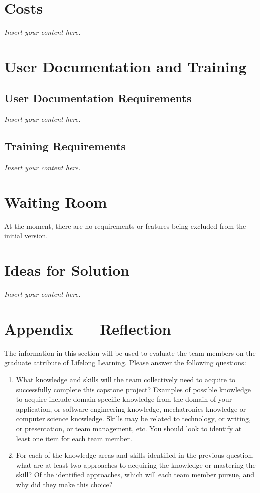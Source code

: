 \documentclass[12pt]{article}
\newcommand{\lips}{\textit{Insert your content here.}}
\begin{document}
\section{Costs}
\lips
\section{User Documentation and Training}
\subsection{User Documentation Requirements}
\lips
\subsection{Training Requirements}
\lips

\section{Waiting Room}
At the moment, there are no requirements or features being excluded from the initial version.

\section{Ideas for Solution}
\lips

\newpage{}
\section*{Appendix --- Reflection}

The information in this section will be used to evaluate the team members on the
graduate attribute of Lifelong Learning.  Please answer the following questions:

\begin{enumerate}
  \item What knowledge and skills will the team collectively need to acquire to
  successfully complete this capstone project?  Examples of possible knowledge
  to acquire include domain specific knowledge from the domain of your
  application, or software engineering knowledge, mechatronics knowledge or
  computer science knowledge.  Skills may be related to technology, or writing,
  or presentation, or team management, etc.  You should look to identify at
  least one item for each team member.
  \item For each of the knowledge areas and skills identified in the previous
  question, what are at least two approaches to acquiring the knowledge or
  mastering the skill?  Of the identified approaches, which will each team
  member pursue, and why did they make this choice?
\end{enumerate}
\end{document}
